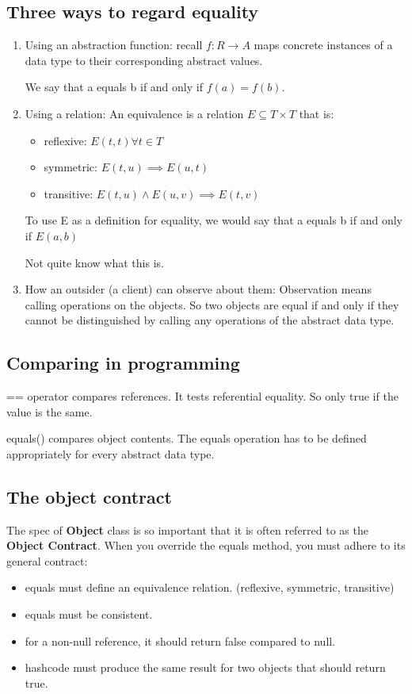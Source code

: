 \documentclass[letterpaper,12pt]{article}
\begin{document}
\subsection{Three ways to regard equality}
\begin{enumerate}
      \item Using an abstraction function: recall $f:R\rightarrow A$ maps concrete
            instances of a data type to their corresponding abstract values.

            We say that a equals b if and only if $f(a)=f(b)$.
      \item Using a relation: An equivalence is a relation $E \subseteq T\times T$ that is:
            \begin{itemize}
                  \item reflexive: $E(t,t)\forall t \in T$
                  \item symmetric: $E(t,u)\implies E(u,t)$
                  \item transitive: $E(t,u)\land E(u,v)\implies E(t,v)$
            \end{itemize}
            To use E as a definition for equality, we would say that a equals b if and only if $E(a,b)$

            Not quite know what this is.

      \item How an outsider (a client) can observe about them: Observation means calling
            operations on the objects. So two objects are equal if and only if they cannot
            be distinguished by calling any operations of the abstract data type.

\end{enumerate}
\subsection{Comparing in programming}
== operator compares references. It tests referential equality. So only true if the value is the same.

equals() compares object contents. The equals operation has to be defined
appropriately for every abstract data type.

\subsection{The object contract}
The spec of \textbf{Object} class is so important that it is often referred to
as the \textbf{Object Contract}. When you override the equals method, you must
adhere to its general contract:
\begin{itemize}
      \item equals must define an equivalence relation. (reflexive, symmetric, transitive)
      \item equals must be consistent.
      \item for a non-null reference, it should return false compared to null.
      \item hashcode must produce the same result for two objects that should return true. \end{itemize}
\end{document}
